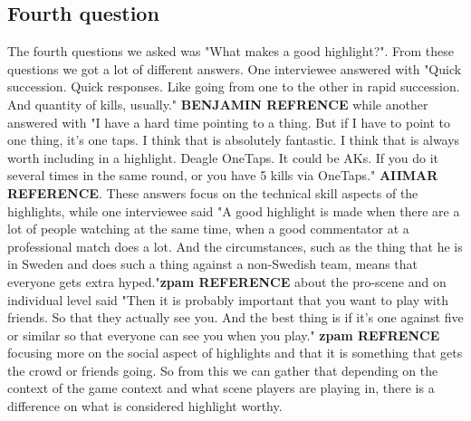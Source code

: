 \subsection{Fourth question}
The fourth questions we asked was "What makes a good highlight?". From these questions we got a lot of different answers. One interviewee answered with "Quick succession. Quick responses. Like going from one to the other in rapid succession. And quantity of kills, usually." \textbf{BENJAMIN REFRENCE} while another answered with "I have a hard time pointing to a thing. But if I have to point to one thing, it's one taps. I think that is absolutely fantastic. I think that is always worth including in a highlight. Deagle OneTaps. It could be AKs. If you do it several times in the same round, or you have 5 kills via OneTaps." \textbf{AIIMAR REFERENCE}. These answers focus on the technical skill aspects of the highlights, while one interviewee said "A good highlight is made when there are a lot of people watching at the same time, when a good commentator at a professional match does a lot. And the circumstances, such as the thing that he is in Sweden and does such a thing against a non-Swedish team, means that everyone gets extra hyped."\textbf{zpam REFERENCE} about the pro-scene and on individual level said "Then it is probably important that you want to play with friends. So that they actually see you. And the best thing is if it's one against five or similar so that everyone can see you when you play." \textbf{zpam REFRENCE} focusing more on the social aspect of highlights and that it is something that gets the crowd or friends going. So from this we can gather that depending on the context of the game context and what scene players are playing in, there is a difference on what is considered highlight worthy.\\\\
